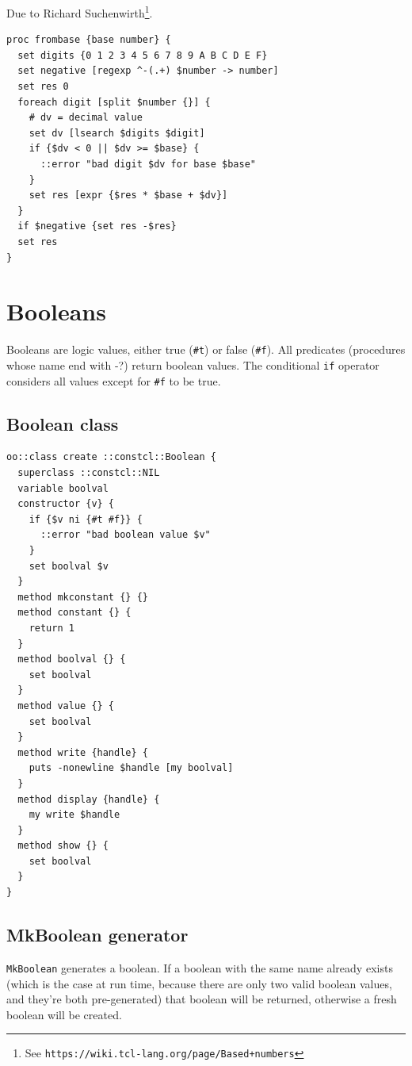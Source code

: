 \documentclass[twoside,9pt]{report}
\begin{document}
Due to Richard Suchenwirth\footnote{See \texttt{https://wiki.tcl-lang.org/page/Based+numbers}}.

\begin{lstlisting}
proc frombase {base number} {
  set digits {0 1 2 3 4 5 6 7 8 9 A B C D E F}
  set negative [regexp ^-(.+) $number -> number]
  set res 0
  foreach digit [split $number {}] {
    # dv = decimal value
    set dv [lsearch $digits $digit]
    if {$dv < 0 || $dv >= $base} {
      ::error "bad digit $dv for base $base"
    }
    set res [expr {$res * $base + $dv}]
  }
  if $negative {set res -$res}
  set res
}
\end{lstlisting}
\section{Booleans}
\label{booleans}


Booleans are logic values, either true (\texttt{\#t}) or false (\texttt{\#f}). All predicates (procedures whose name end with -?) return boolean values. The conditional \texttt{if} operator considers all values except for \texttt{\#f} to be true.

\subsection{Boolean class}
\label{boolean-class}
\begin{lstlisting}
oo::class create ::constcl::Boolean {
  superclass ::constcl::NIL
  variable boolval
  constructor {v} {
    if {$v ni {#t #f}} {
      ::error "bad boolean value $v"
    }
    set boolval $v
  }
  method mkconstant {} {}
  method constant {} {
    return 1
  }
  method boolval {} {
    set boolval
  }
  method value {} {
    set boolval
  }
  method write {handle} {
    puts -nonewline $handle [my boolval]
  }
  method display {handle} {
    my write $handle
  }
  method show {} {
    set boolval
  }
}
\end{lstlisting}
\subsection{MkBoolean generator}
\label{mkboolean-generator}


\texttt{MkBoolean} generates a boolean. If a boolean with the same name already exists (which is the case at run time, because there are only two valid boolean values, and they're both pre-generated) that boolean will be returned, otherwise a fresh boolean will be created.
\end{document}
